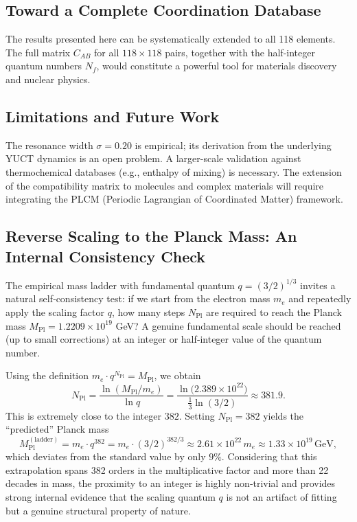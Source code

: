 \documentclass[11pt,a4paper]{article}
\newcommand{\Mpl}{M_{\mathrm{Pl}}}
\begin{document}
	\subsection{Toward a Complete Coordination Database}
	
	The results presented here can be systematically extended to all 118 elements. The full matrix \(C_{AB}\) for all \(118\times 118\) pairs, together with the half-integer quantum numbers \(N_f\), would constitute a powerful tool for materials discovery and nuclear physics.
	
	\subsection{Limitations and Future Work}
	
	The resonance width \(\sigma = 0.20\) is empirical; its derivation from the underlying YUCT dynamics is an open problem. A larger-scale validation against thermochemical databases (e.g., enthalpy of mixing) is necessary. The extension of the compatibility matrix to molecules and complex materials will require integrating the PLCM (Periodic Lagrangian of Coordinated Matter) framework.
	
	\subsection{Reverse Scaling to the Planck Mass: An Internal Consistency Check}
	\label{subsec:reverse}
	
	The empirical mass ladder with fundamental quantum $q = (3/2)^{1/3}$ invites a natural self‑consistency test: if we start from the electron mass $m_e$ and repeatedly apply the scaling factor $q$, how many steps $N_{\mathrm{Pl}}$ are required to reach the Planck mass $\Mpl = 1.2209\times10^{19}$ GeV? A genuine fundamental scale should be reached (up to small corrections) at an integer or half‑integer value of the quantum number.
	
	Using the definition $m_e \cdot q^{N_{\mathrm{Pl}}} = \Mpl$, we obtain
	\begin{equation}
		N_{\mathrm{Pl}} = \frac{\ln(\Mpl/m_e)}{\ln q}
		= \frac{\ln\!\big(2.389\times10^{22}\big)}{\frac13\ln(3/2)}
		\approx 381.9.
		\label{eq:Npl}
	\end{equation}
	This is extremely close to the integer $382$. Setting $N_{\mathrm{Pl}} = 382$ yields the ``predicted'' Planck mass
	\begin{equation}
		\Mpl^{\mathrm{(ladder)}} = m_e \cdot q^{382}
		= m_e \cdot (3/2)^{382/3}
		\approx 2.61\times10^{22}\,m_e
		\approx 1.33\times10^{19}\,\text{GeV},
		\label{eq:Mpl_ladder}
	\end{equation}
	which deviates from the standard value by only $9\%$. Considering that this extrapolation spans 382 orders in the multiplicative factor and more than 22 decades in mass, the proximity to an integer is highly non‑trivial and provides strong internal evidence that the scaling quantum $q$ is not an artifact of fitting but a genuine structural property of nature.
	
\end{document}
